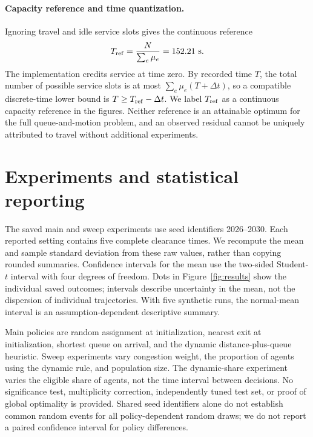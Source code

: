 \documentclass[10pt]{article}
\begin{document}
\paragraph{Capacity reference and time quantization.}
Ignoring travel and idle service slots gives the continuous reference
\[
T_{\rm ref}=\frac{N}{\sum_e\mu_e}=152.21\ \mathrm{s}.
\]
The implementation credits service at time zero. By recorded time $T$, the total number of possible service slots is at most $\sum_e\mu_e(T+\Delta t)$, so a compatible discrete-time lower bound is $T\ge T_{\rm ref}-\Delta t$. We label $T_{\rm ref}$ as a continuous capacity reference in the figures. Neither reference is an attainable optimum for the full queue-and-motion problem, and an observed residual cannot be uniquely attributed to travel without additional experiments.

\section{Experiments and statistical reporting}
The saved main and sweep experiments use seed identifiers 2026--2030. Each reported setting contains five complete clearance times. We recompute the mean and sample standard deviation from these raw values, rather than copying rounded summaries. Confidence intervals for the mean use the two-sided Student-$t$ interval with four degrees of freedom. Dots in Figure~\ref{fig:results} show the individual saved outcomes; intervals describe uncertainty in the mean, not the dispersion of individual trajectories. With five synthetic runs, the normal-mean interval is an assumption-dependent descriptive summary.

Main policies are random assignment at initialization, nearest exit at initialization, shortest queue on arrival, and the dynamic distance-plus-queue heuristic. Sweep experiments vary congestion weight, the proportion of agents using the dynamic rule, and population size. The dynamic-share experiment varies the eligible share of agents, not the time interval between decisions. No significance test, multiplicity correction, independently tuned test set, or proof of global optimality is provided. Shared seed identifiers alone do not establish common random events for all policy-dependent random draws; we do not report a paired confidence interval for policy differences.

\begin{table}[ht]
\centering\small
\caption{Main comparison, recomputed from five complete raw runs per policy. SD is the sample standard deviation. Mean/ref. uses the continuous capacity reference.}\label{tab:main}
\end{table}
\end{document}

